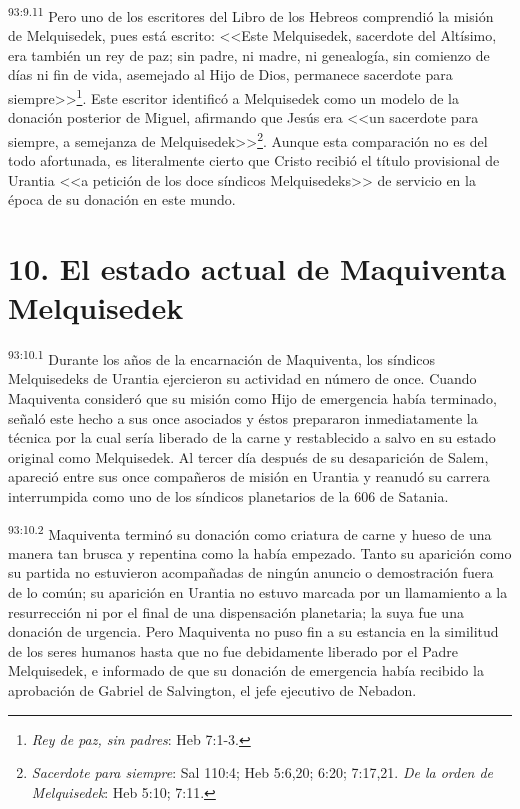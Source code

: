 \par
\textsuperscript{93:9.11} Pero uno de los escritores del Libro de los Hebreos comprendió la misión de Melquisedek, pues está escrito: <<Este Melquisedek, sacerdote del Altísimo, era también un rey de paz; sin padre, ni madre, ni genealogía, sin comienzo de días ni fin de vida, asemejado al Hijo de Dios, permanece sacerdote para siempre>>\footnote{\textit{Rey de paz, sin padres}: Heb 7:1-3.}. Este escritor identificó a Melquisedek como un modelo de la donación posterior de Miguel, afirmando que Jesús era <<un sacerdote para siempre, a semejanza de Melquisedek>>\footnote{\textit{Sacerdote para siempre}: Sal 110:4; Heb 5:6,20; 6:20; 7:17,21. \textit{De la orden de Melquisedek}: Heb 5:10; 7:11.}. Aunque esta comparación no es del todo afortunada, es literalmente cierto que Cristo recibió el título provisional de Urantia <<a petición de los doce síndicos Melquisedeks>> de servicio en la época de su donación en este mundo.

\section*{10. El estado actual de Maquiventa Melquisedek}
\par
\textsuperscript{93:10.1} Durante los años de la encarnación de Maquiventa, los síndicos Melquisedeks de Urantia ejercieron su actividad en número de once. Cuando Maquiventa consideró que su misión como Hijo de emergencia había terminado, señaló este hecho a sus once asociados y éstos prepararon inmediatamente la técnica por la cual sería liberado de la carne y restablecido a salvo en su estado original como Melquisedek. Al tercer día después de su desaparición de Salem, apareció entre sus once compañeros de misión en Urantia y reanudó su carrera interrumpida como uno de los síndicos planetarios de la 606 de Satania.

\par
\textsuperscript{93:10.2} Maquiventa terminó su donación como criatura de carne y hueso de una manera tan brusca y repentina como la había empezado. Tanto su aparición como su partida no estuvieron acompañadas de ningún anuncio o demostración fuera de lo común; su aparición en Urantia no estuvo marcada por un llamamiento a la resurrección ni por el final de una dispensación planetaria; la suya fue una donación de urgencia. Pero Maquiventa no puso fin a su estancia en la similitud de los seres humanos hasta que no fue debidamente liberado por el Padre Melquisedek, e informado de que su donación de emergencia había recibido la aprobación de Gabriel de Salvington, el jefe ejecutivo de Nebadon.

